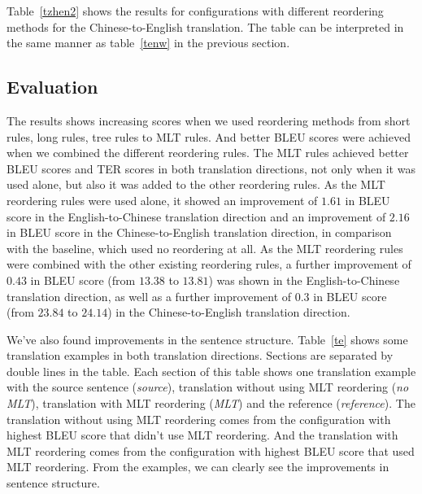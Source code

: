 \documentclass[a4paper]{article}
\begin{document}
Table~\ref{tzhen2} shows the results for configurations with different reordering methods for the Chinese-to-English translation. The table can be interpreted in the same manner as table~\ref{tenw} in the previous section.

\subsection{Evaluation}

The results shows increasing scores when we used reordering methods from short rules, long rules, tree rules to MLT rules. And better BLEU scores were achieved when we combined the different reordering rules. The MLT rules achieved better BLEU scores and TER scores in both translation directions, not only when it was used alone, but also it was added to the other reordering rules. As the MLT reordering rules were used alone, it showed an improvement of $1.61$ in BLEU score in the English-to-Chinese translation direction and an improvement of $2.16$ in BLEU score in the Chinese-to-English translation direction, in comparison with the baseline, which used no reordering at all. As the MLT reordering rules were combined with the other existing reordering rules, a further improvement of $0.43$ in BLEU score (from $13.38$ to $13.81$) was shown in the English-to-Chinese translation direction, as well as a further improvement of $0.3$ in BLEU score (from $23.84$ to $24.14$) in the Chinese-to-English translation direction.

We've also found improvements in the sentence structure. Table~\ref{te} shows some translation examples in both translation directions. Sections are separated by double lines in the table. Each section of this table shows one translation example with the source sentence (\emph{source}), translation without using MLT reordering (\emph{no MLT}), translation with MLT reordering (\emph{MLT}) and the reference (\emph{reference}). The translation without using MLT reordering comes from the configuration with highest BLEU score that didn't use MLT reordering. And the translation with MLT reordering comes from the configuration with highest BLEU score that used MLT reordering. From the examples, we can clearly see the improvements in sentence structure.
\end{document}
